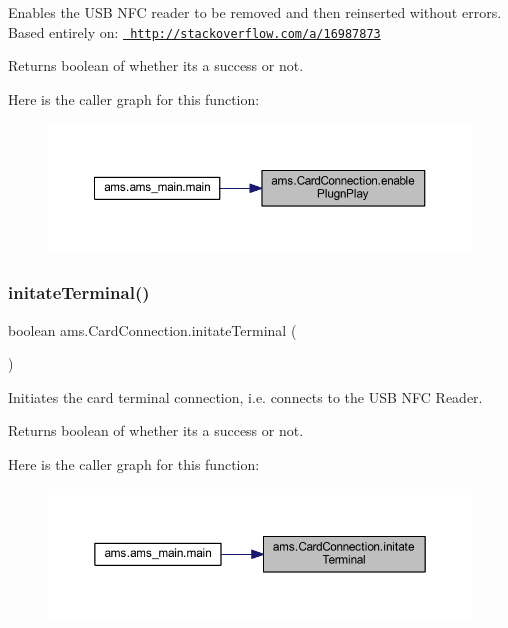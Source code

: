 Enables the U\+SB N\+FC reader to be removed and then reinserted without errors. Based entirely on\+: \href{http://stackoverflow.com/a/16987873}{\texttt{ http\+://stackoverflow.\+com/a/16987873}} \begin{DoxyReturn}{Returns}
boolean of whether it\textquotesingle{}s a success or not. 
\end{DoxyReturn}
Here is the caller graph for this function\+:\nopagebreak
\begin{figure}[H]
\begin{center}
\leavevmode
\includegraphics[width=350pt]{classams_1_1_card_connection_a84c6991f3340668fe44a3b7122719bb7_icgraph}
\end{center}
\end{figure}
\mbox{\label{classams_1_1_card_connection_a29c57f229be609d06518d8764bcee323}} 
\subsubsection{\texorpdfstring{initateTerminal()}{initateTerminal()}}
{\footnotesize\ttfamily boolean ams.\+Card\+Connection.\+initate\+Terminal (\begin{DoxyParamCaption}{ }\end{DoxyParamCaption})}

Initiates the card terminal connection, i.\+e. connects to the U\+SB N\+FC Reader. \begin{DoxyReturn}{Returns}
boolean of whether it\textquotesingle{}s a success or not. 
\end{DoxyReturn}
Here is the caller graph for this function\+:\nopagebreak
\begin{figure}[H]
\begin{center}
\leavevmode
\includegraphics[width=350pt]{classams_1_1_card_connection_a29c57f229be609d06518d8764bcee323_icgraph}
\end{center}
\end{figure}
\mbox{\label{classams_1_1_card_connection_ad64ef421bc44c06dc3ed799f281182ae}} 
